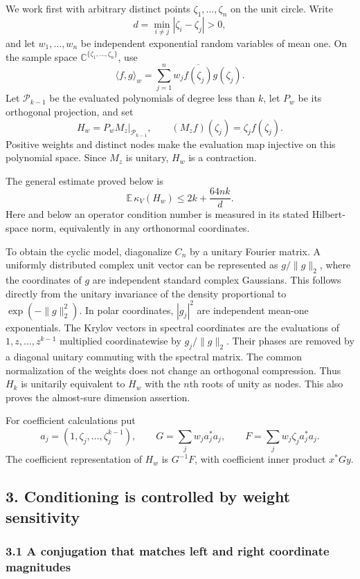 \documentclass[
  11pt,
]{article}
\begin{document}
We work first with arbitrary distinct points \(\zeta_1,\ldots,\zeta_n\)
on the unit circle. Write \[
d=\min_{i\ne j}|\zeta_i-\zeta_j|>0,
\] and let \(w_1,\ldots,w_n\) be independent exponential random
variables of mean one. On the sample space
\(\mathbb C^{\{\zeta_1,\ldots,\zeta_n\}}\), use \[
\langle f,g\rangle_w=\sum_{j=1}^n w_j\overline{f(\zeta_j)}g(\zeta_j).
\] Let \(\mathcal P_{k-1}\) be the evaluated polynomials of degree less
than \(k\), let \(P_w\) be its orthogonal projection, and set \[
H_w=P_wM_z\big|_{\mathcal P_{k-1}},\qquad (M_zf)(\zeta_j)=\zeta_jf(\zeta_j).
\] Positive weights and distinct nodes make the evaluation map injective
on this polynomial space. Since \(M_z\) is unitary, \(H_w\) is a
contraction.

The general estimate proved below is \[
\mathbb E\,\kappa_V(H_w)\leq2k+\frac{64nk}{d}. \tag{3}
\] Here and below an operator condition number is measured in its stated
Hilbert-space norm, equivalently in any orthonormal coordinates.

To obtain the cyclic model, diagonalize \(C_n\) by a unitary Fourier
matrix. A uniformly distributed complex unit vector can be represented
as \(g/\|g\|_2\), where the coordinates of \(g\) are independent
standard complex Gaussians. This follows directly from the unitary
invariance of the density proportional to \(\exp(-\|g\|_2^2)\). In polar
coordinates, \(|g_j|^2\) are independent mean-one exponentials. The
Krylov vectors in spectral coordinates are the evaluations of
\(1,z,\ldots,z^{k-1}\) multiplied coordinatewise by \(g_j/\|g\|_2\).
Their phases are removed by a diagonal unitary commuting with the
spectral matrix. The common normalization of the weights does not change
an orthogonal compression. Thus \(H_k\) is unitarily equivalent to
\(H_w\) with the \(n\)th roots of unity as nodes. This also proves the
almost-sure dimension assertion.

For coefficient calculations put \[
a_j=(1,\zeta_j,\ldots,\zeta_j^{k-1}),\qquad
G=\sum_jw_ja_j^*a_j,\qquad F=\sum_jw_j\zeta_ja_j^*a_j.
\] The coefficient representation of \(H_w\) is \(G^{-1}F\), with
coefficient inner product \(x^*Gy\).

\subsection{3. Conditioning is controlled by weight
sensitivity}\label{conditioning-is-controlled-by-weight-sensitivity}

\subsubsection{3.1 A conjugation that matches left and right coordinate
magnitudes}\label{a-conjugation-that-matches-left-and-right-coordinate-magnitudes}
\end{document}

